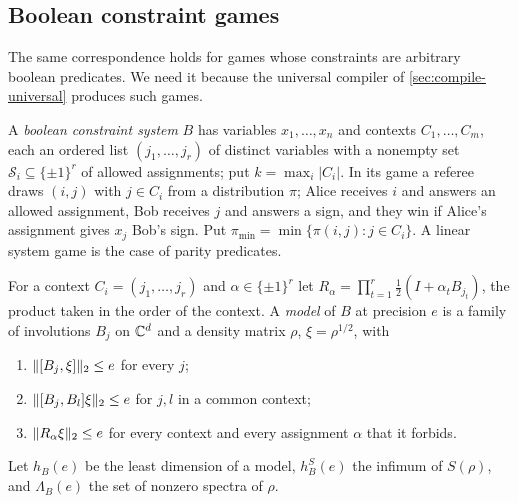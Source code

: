 \subsection{Boolean constraint games}\label{sec:boolean}

The same correspondence holds for games whose constraints are arbitrary boolean predicates. We need it because the
universal compiler of \cref{sec:compile-universal} produces such games.

\begin{definition}\label{def:bcs}
A \emph{boolean constraint system} $B$ has variables $x_1,\dots,x_n$ and contexts $C_1,\dots,C_m$, each an ordered list
$(j_1,\dots,j_r)$ of distinct variables with a nonempty set $\mathcal S_i\subseteq\{\pm1\}^r$ of allowed assignments; put
$k=\max_i|C_i|$. In its game a referee draws $(i,j)$ with $j\in C_i$ from a distribution $\pi$; Alice receives $i$ and
answers an allowed assignment, Bob receives $j$ and answers a sign, and they win if Alice's assignment gives $x_j$ Bob's
sign. Put $\pi_{\min}=\min\{\pi(i,j):j\in C_i\}$. A linear system game is the case of parity predicates.
\end{definition}

\begin{definition}\label{def:boolean-profile}
For a context $C_i=(j_1,\dots,j_r)$ and $\alpha\in\{\pm1\}^r$ let $R_\alpha=\prod_{t=1}^r\frac12(I+\alpha_tB_{j_t})$, the
product taken in the order of the context. A \emph{model} of $B$ at precision $e$ is a family of involutions $B_j$ on
$\mathbb C^d$ and a density matrix $\rho$, $\xi=\rho^{1/2}$, with
\begin{enumerate}[label=(B\arabic*),itemsep=1pt]
\item\label{B1} $\lVert [B_j,\xi]\rVert_2\le e$ for every $j$;
\item\label{B2} $\lVert [B_j,B_l]\xi\rVert_2\le e$ for $j,l$ in a common context;
\item\label{B3} $\lVert R_\alpha\xi\rVert_2\le e$ for every context and every assignment $\alpha$ that it forbids.
\end{enumerate}
Let $h_B(e)$ be the least dimension of a model, $h^S_B(e)$ the infimum of $S(\rho)$, and $\Lambda_B(e)$ the set of nonzero
spectra of $\rho$.
\end{definition}


